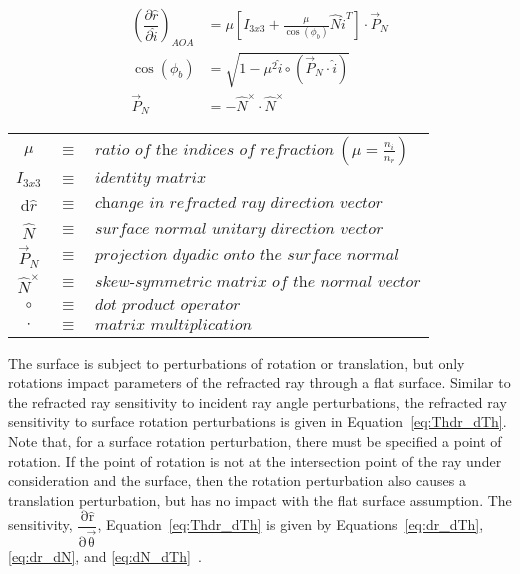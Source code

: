 \begin{table}[H]		%
\centering
\begin{subequations}		%
\begin{align}
	\label{eq:dr_di_AOA}
	\left(\dfrac{\partial\hat{r}}{\partial\hat{i}}\right)_{AOA} &= \mu \left[I_{3x3}+\frac{\mu}{\cos(\phi_b)}\hat{N}\hat{i}^T\right]\cdot \vec{P}_N \\[3mm]
	\label{eq:cosPhiB}
	\cos(\phi_b) &= \sqrt{1-\mu^2\hat{i}\circ(\vec{P}_N \cdot \hat{i})} \\[3mm]
	\label{eq:projectionDyadic}
	\vec{P}_N &= -\hat{N}^\times \cdot \hat{N}^\times
\end{align}
\end{subequations}
\begin{tabular}{cll}
$\mu$  & $\equiv$ & $\textit{ratio of the indices of refraction} \ \left (\mu  = \frac{n_i}{n_r} \right)$ \\
$I_{3x3}$ & $\equiv$ & $\textit{identity matrix}$ \\
d$\hat{r}$ & $\equiv$ & $\textit{change in refracted ray direction vector}$ \\
$\hat{N}$ & $\equiv$ & $\textit{surface normal unitary direction vector}$ \\
$\vec{P}_N$ & $\equiv$ & $\textit{projection dyadic onto the surface normal}$ \\
$\hat{N}^\times$ & $\equiv$ & $\textit{skew-symmetric matrix of the normal vector}$ \\
$\circ$ & $\equiv$ & $\textit{dot product operator}$ \\
$\cdot$ & $\equiv$ & $\textit{matrix multiplication}$
\end{tabular}
\end{table}

The surface is subject to perturbations of rotation or translation, but only rotations impact parameters of the refracted ray through a flat surface. Similar to the refracted ray sensitivity to incident ray angle perturbations, the refracted ray sensitivity to surface rotation perturbations is given in Equation~\eqref{eq:Thdr_dTh}. Note that, for a surface rotation perturbation, there must be specified a point of rotation. If the point of rotation is not at the intersection point of the ray under consideration and the surface, then the rotation perturbation also causes a translation perturbation, but has no impact with the flat surface assumption. The sensitivity, $\mathrm{ \dfrac{\partial\hat{r}}{\partial\vec{\theta}}}$, Equation~\eqref{eq:Thdr_dTh} is given by Equations~\eqref{eq:dr_dTh}, \eqref{eq:dr_dN}, and \eqref{eq:dN_dTh}~\cite{RedBreck}.

